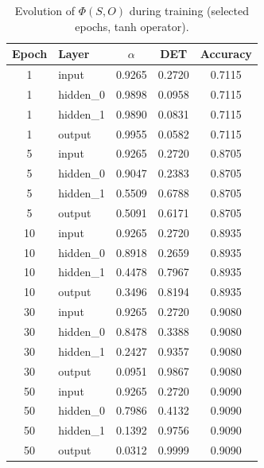 \documentclass[11pt]{article}
\begin{document}
\begin{table}[h]
	\centering
	\caption{Evolution of $\Phi(S,O)$ during training (selected epochs, tanh operator).}
	\begin{tabular}{c l c c c}
		\toprule
		Epoch & Layer     & $\alpha$ & DET    & Accuracy \\
		\midrule
		1     & input     & 0.9265   & 0.2720 & 0.7115   \\
		1     & hidden\_0 & 0.9898   & 0.0958 & 0.7115   \\
		1     & hidden\_1 & 0.9890   & 0.0831 & 0.7115   \\
		1     & output    & 0.9955   & 0.0582 & 0.7115   \\
		5     & input     & 0.9265   & 0.2720 & 0.8705   \\
		5     & hidden\_0 & 0.9047   & 0.2383 & 0.8705   \\
		5     & hidden\_1 & 0.5509   & 0.6788 & 0.8705   \\
		5     & output    & 0.5091   & 0.6171 & 0.8705   \\
		10    & input     & 0.9265   & 0.2720 & 0.8935   \\
		10    & hidden\_0 & 0.8918   & 0.2659 & 0.8935   \\
		10    & hidden\_1 & 0.4478   & 0.7967 & 0.8935   \\
		10    & output    & 0.3496   & 0.8194 & 0.8935   \\
		30    & input     & 0.9265   & 0.2720 & 0.9080   \\
		30    & hidden\_0 & 0.8478   & 0.3388 & 0.9080   \\
		30    & hidden\_1 & 0.2427   & 0.9357 & 0.9080   \\
		30    & output    & 0.0951   & 0.9867 & 0.9080   \\
		50    & input     & 0.9265   & 0.2720 & 0.9090   \\
		50    & hidden\_0 & 0.7986   & 0.4132 & 0.9090   \\
		50    & hidden\_1 & 0.1392   & 0.9756 & 0.9090   \\
		50    & output    & 0.0312   & 0.9999 & 0.9090   \\
		\bottomrule
	\end{tabular}
	\label{tab:training}
\end{table}
\end{document}
